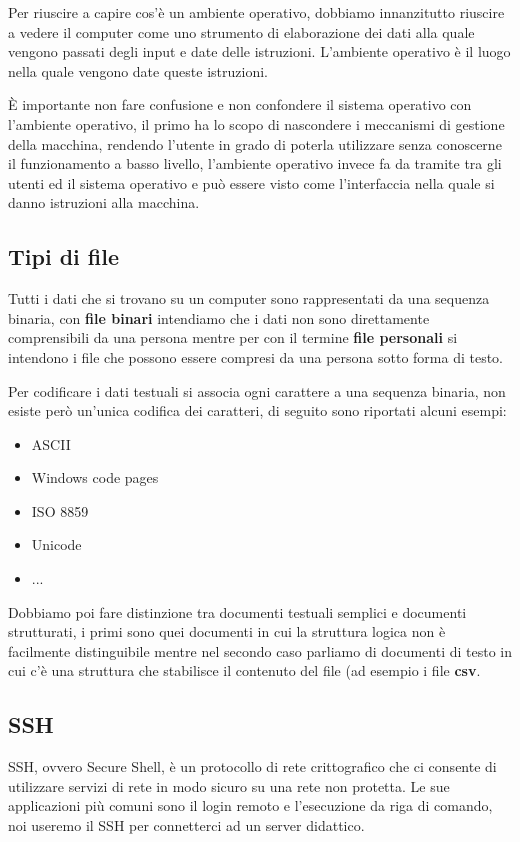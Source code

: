 \documentclass[../main.tex]{subfiles}
\begin{document}
Per riuscire a capire cos'è un ambiente operativo, dobbiamo innanzitutto riuscire a vedere il computer come uno strumento di elaborazione dei dati alla quale vengono passati degli input e date delle istruzioni. L'ambiente operativo è il luogo nella quale vengono date queste istruzioni.

È importante non fare confusione e non confondere il sistema operativo con l'ambiente operativo, il primo ha lo scopo di nascondere i meccanismi di gestione della macchina, rendendo l'utente in grado di poterla utilizzare senza conoscerne il funzionamento a basso livello, l'ambiente operativo invece fa da tramite tra gli utenti ed il sistema operativo e può essere visto come l'interfaccia nella quale si danno istruzioni alla macchina.

\subsection{Tipi di file}
Tutti i dati che si trovano su un computer sono rappresentati da una sequenza binaria, con \textbf{file binari} intendiamo che i dati non sono direttamente comprensibili da una persona mentre per con il termine \textbf{file personali} si intendono i file che possono essere compresi da una persona sotto forma di testo.

Per codificare i dati testuali si associa ogni carattere a una sequenza binaria, non esiste però un'unica codifica dei caratteri, di seguito sono riportati alcuni esempi:
\begin{itemize}
    \item ASCII
    \item Windows code pages
    \item ISO 8859
    \item Unicode
    \item ...
\end{itemize}

Dobbiamo poi fare distinzione tra documenti testuali semplici e documenti strutturati, i primi sono quei documenti in cui la struttura logica non è facilmente distinguibile mentre nel secondo caso parliamo di documenti di testo in cui c'è una struttura che stabilisce il contenuto del file (ad esempio i file \textbf{csv}.

\subsection{SSH}
SSH, ovvero Secure Shell, è un protocollo di rete crittografico che ci consente di utilizzare servizi di rete in modo sicuro su una rete non protetta. Le sue applicazioni più comuni sono il login remoto e l'esecuzione da riga di comando, noi useremo il SSH per connetterci ad un server didattico.
\end{document}
